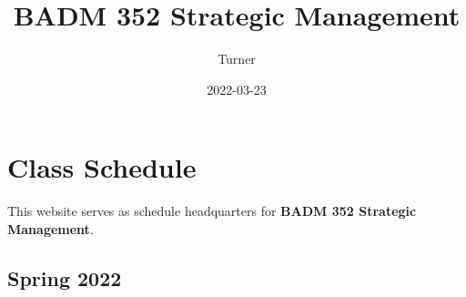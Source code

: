 \documentclass[
]{book}
\title{BADM 352 Strategic Management}
\author{Turner}
\date{2022-03-23}
\begin{document}
\maketitle

{
\setcounter{tocdepth}{1}
\tableofcontents
}
\hypertarget{class-schedule}{%
\chapter*{Class Schedule}\label{class-schedule}}

This website serves as schedule headquarters for \textbf{BADM 352 Strategic Management}.

\hypertarget{spring-2022}{%
\section*{Spring 2022}\label{spring-2022}}
\end{document}
